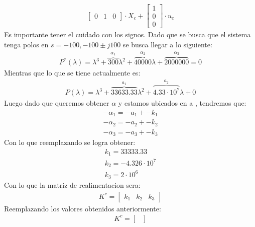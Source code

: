 \documentclass[
  11pt,
  letterpaper,
   addpoints,
   answers
  ]{exam}
\begin{document}
\begin{questions}
\begin{solution}
\begin{align}
\begin{bmatrix}
            0 & 1 & 0
            \end{bmatrix}
            \cdot X_c +
            \begin{bmatrix}
            1 \\
            0 \\
            0
            \end{bmatrix}
            \cdot u_c
        \end{align}
        Es importante tener el cuidado con los signos. Dado que se busca que el sistema tenga polos en \( s = -100, -100 \pm j100 \) se busca llegar a lo siguiente:
        \begin{align}
            P^{*}(\lambda) = \lambda^3 + 
            \overbrace{300}^{\alpha_1} \lambda^2 + 
            \overbrace{40000}^{\alpha_2} \lambda + 
            \overbrace{2000000}^{\alpha_3} = 0
        \end{align}
        Mientras que lo que se tiene actualmente es:
        \begin{align}
            P(\lambda) = \lambda^3 + 
            \overbrace{33633.33}^{a_1} \lambda^2 + 
            \overbrace{4.33 \cdot 10^7}^{a_2} \lambda + 0
        \end{align}
        Luego dado que queremos obtener $\alpha$ y estamos ubicados en a , tendremos que:
        \begin{align}
            -\alpha_{1} = -a_{1} + -k_{1}\\
            -\alpha_{2} = -a_{2} + -k_{2}\\
            -\alpha_{3} = -a_{3} + -k_{3}
        \end{align}
        Con lo que reemplazando se logra obtener:
        \begin{align}
            k_{1} = 33333.33\\
            k_{2} = -4.326 \cdot 10^{7}\\
            k_{3} = 2 \cdot 10^{6}
        \end{align}
        Con lo que la matriz de realimentacion sera:
        \begin{align}
            K^{c} = 
            \begin{bmatrix}
                k_{1} & k_{2} & k_{3}
            \end{bmatrix}
        \end{align}
        Reemplazando los valores obtenidos anteriormente:
        \begin{align}
            K^{c} = 
            \begin{bmatrix}

\end{bmatrix}
\end{align}
\end{solution}
\end{questions}
\end{document}
